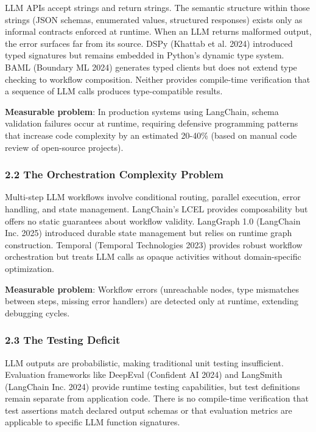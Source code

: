 \documentclass[
]{article}
\begin{document}
LLM APIs accept strings and return strings. The semantic structure
within those strings (JSON schemas, enumerated values, structured
responses) exists only as informal contracts enforced at runtime. When
an LLM returns malformed output, the error surfaces far from its source.
DSPy (Khattab et al. 2024) introduced typed signatures but remains
embedded in Python's dynamic type system. BAML (Boundary ML 2024)
generates typed clients but does not extend type checking to workflow
composition. Neither provides compile-time verification that a sequence
of LLM calls produces type-compatible results.

\textbf{Measurable problem}: In production systems using LangChain,
schema validation failures occur at runtime, requiring defensive
programming patterns that increase code complexity by an estimated
20-40\% (based on manual code review of open-source projects).

\subsubsection{2.2 The Orchestration Complexity
Problem}\label{the-orchestration-complexity-problem}

Multi-step LLM workflows involve conditional routing, parallel
execution, error handling, and state management. LangChain's LCEL
provides composability but offers no static guarantees about workflow
validity. LangGraph 1.0 (LangChain Inc. 2025) introduced durable state
management but relies on runtime graph construction. Temporal (Temporal
Technologies 2023) provides robust workflow orchestration but treats LLM
calls as opaque activities without domain-specific optimization.

\textbf{Measurable problem}: Workflow errors (unreachable nodes, type
mismatches between steps, missing error handlers) are detected only at
runtime, extending debugging cycles.

\subsubsection{2.3 The Testing Deficit}\label{the-testing-deficit}

LLM outputs are probabilistic, making traditional unit testing
insufficient. Evaluation frameworks like DeepEval (Confident AI 2024)
and LangSmith (LangChain Inc. 2024) provide runtime testing
capabilities, but test definitions remain separate from application
code. There is no compile-time verification that test assertions match
declared output schemas or that evaluation metrics are applicable to
specific LLM function signatures.
\end{document}
